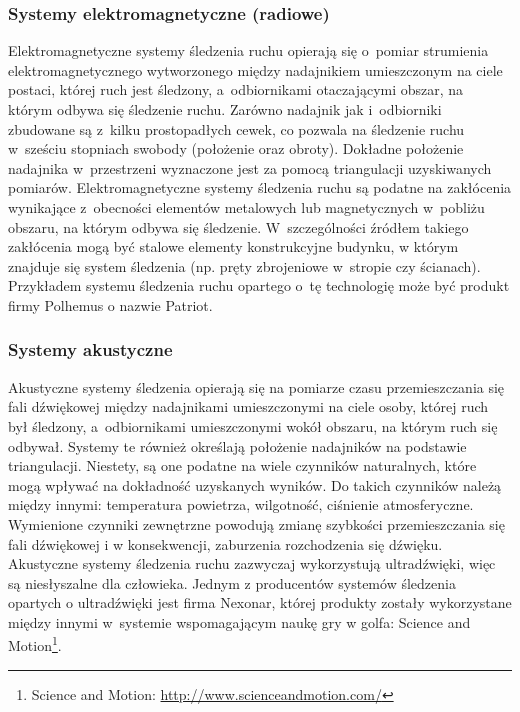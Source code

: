 \subsubsection*{Systemy elektromagnetyczne (radiowe)}
Elektromagnetyczne systemy śledzenia ruchu opierają się o~pomiar strumienia elektromagnetycznego wytworzonego między nadajnikiem umieszczonym na ciele postaci, której ruch jest śledzony, a~odbiornikami otaczającymi obszar, na którym odbywa się śledzenie ruchu. Zarówno nadajnik jak i~odbiorniki zbudowane są z~kilku prostopadłych cewek, co pozwala na śledzenie ruchu w~sześciu stopniach swobody (położenie oraz obroty). Dokładne położenie nadajnika w~przestrzeni wyznaczone jest za pomocą triangulacji uzyskiwanych pomiarów. Elektromagnetyczne systemy śledzenia ruchu są podatne na zakłócenia wynikające z~obecności elementów metalowych lub magnetycznych w~pobliżu obszaru, na którym odbywa się śledzenie. W~szczególności źródłem  takiego zakłócenia mogą być stalowe elementy konstrukcyjne budynku, w którym znajduje się system śledzenia (np. pręty zbrojeniowe w~stropie czy ścianach). Przykładem systemu śledzenia ruchu opartego o~tę technologię może być produkt firmy Polhemus o nazwie Patriot{}.
									
\subsubsection*{Systemy akustyczne}
Akustyczne systemy śledzenia opierają się na pomiarze czasu przemieszczania się fali dźwiękowej między nadajnikami umieszczonymi na ciele osoby, której ruch był śledzony, a~odbiornikami umieszczonymi wokół obszaru, na którym ruch się odbywał. Systemy te również określają położenie nadajników na podstawie triangulacji. Niestety, są one podatne na wiele czynników naturalnych, które mogą wpływać na dokładność uzyskanych wyników. Do takich czynników należą między innymi: temperatura powietrza, wilgotność, ciśnienie atmosferyczne. Wymienione czynniki zewnętrzne powodują zmianę szybkości przemieszczania się fali dźwiękowej i w konsekwencji, zaburzenia rozchodzenia się dźwięku. Akustyczne systemy śledzenia ruchu zazwyczaj wykorzystują ultradźwięki, więc są niesłyszalne dla człowieka. Jednym z producentów systemów śledzenia opartych o ultradźwięki jest firma Nexonar{}, której produkty zostały wykorzystane między innymi w~systemie wspomagającym naukę gry w golfa: Science and Motion{\footnote{Science and Motion: \url{http://www.scienceandmotion.com/}}}.
									
